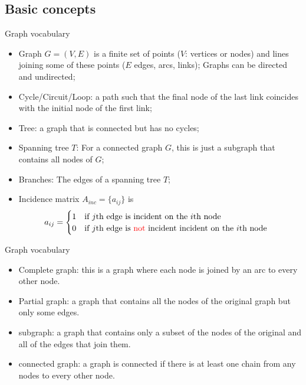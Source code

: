 \documentclass[xcolor=dvipsnames]{beamer}
\begin{document}
\subsection{Basic concepts}
\begin{frame}{Graph vocabulary}
\begin{itemize}
	\item {\color{red}Graph} $G=(V, E)$ is a finite set of points ($V$: vertices or nodes) and lines joining some of these points ($E$ edges, arcs, links); Graphs can be directed and {\color{red}undirected};
	\item Cycle/Circuit/Loop: a path such that the final node of the last link coincides with the initial node of the first link;
	\item Tree: a graph that is connected but has no cycles;
	\item Spanning tree $T$: For a connected graph $G$, this is just a subgraph that contains all nodes of $G$;
	\item Branches: The edges of a spanning tree $T$;
	\item Incidence matrix $A_{inc}=\{a_{ij}\}$ is
	\begin{align*}
		a_{ij} &= 
		\begin{cases}
			1 & \mbox{if $j$th edge is incident on the $i$th node}\\
			0& \mbox{if $j$th edge is {\color{red}not} incident incident on the $i$th node}\\
		\end{cases}
	\end{align*}
\end{itemize}
\end{frame}
\begin{frame}{Graph vocabulary}
	\begin{itemize}
		\item Complete graph: this is a graph where each node is joined by an arc to every other node.
		\item Partial graph: a graph that contains all the nodes of the original graph but only some edges.
		\item subgraph: a graph that contains only a subset of the nodes of the original and all of the edges that join them.
		\item connected graph: a graph is connected if there is at least one chain from any nodes to every other node.
	\end{itemize}
\end{frame}
\end{document}
